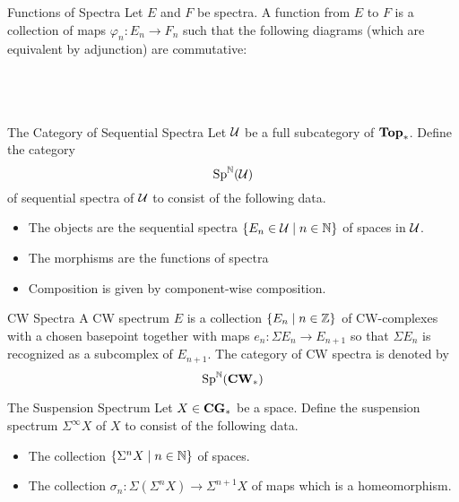 \documentclass[a4paper]{article}
\begin{document}
\begin{defn}{Functions of Spectra}{} Let $E$ and $F$ be spectra. A function from $E$ to $F$ is a collection of maps $\varphi_n:E_n\to F_n$ such that the following diagrams (which are equivalent by adjunction) are commutative: \\~\\
\\~\\
\end{defn}

\begin{defn}{The Category of Sequential Spectra}{} Let $\mathcal{U}$ be a full subcategory of $\bold{Top}_\ast$. Define the category $$\text{Sp}^{\mathbb{N}}(\mathcal{U})$$ of sequential spectra of $\mathcal{U}$ to consist of the following data. 
\begin{itemize}
\item The objects are the sequential spectra $\{E_n\in\mathcal{U}\;|\;n\in\mathbb{N}\}$ of spaces in $\mathcal{U}$. 
\item The morphisms are the functions of spectra
\item Composition is given by component-wise composition. 
\end{itemize}
\end{defn}

\begin{defn}{CW Spectra}{} A CW spectrum $E$ is a collection $\{E_n\;|\;n\in\mathbb{Z}\}$ of CW-complexes with a chosen basepoint together with maps $e_n:\Sigma E_n\to E_{n+1}$ so that $\Sigma E_n$ is recognized as a subcomplex of $E_{n+1}$. The category of CW spectra is denoted by $$\text{Sp}^{\mathbb{N}}(\bold{CW}_\ast)$$
\end{defn}

\begin{defn}{The Suspension Spectrum}{} Let $X\in\bold{CG}_\ast$ be a space. Define the suspension spectrum $\Sigma^\infty X$ of $X$ to consist of the following data. 
\begin{itemize}
\item The collection $\{\Sigma^n X\;|\;n\in\mathbb{N}\}$ of spaces. 
\item The collection $\sigma_n:\Sigma(\Sigma^nX)\to\Sigma^{n+1}X$ of maps which is a homeomorphism. 
\end{itemize}
\end{defn}
\end{document}
